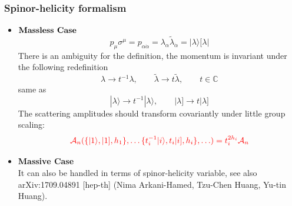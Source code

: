 \documentclass{beamer}
\newcommand{\aket}[1]{|#1\rangle}
\newcommand{\sket}[1]{|#1]}
\begin{document}
\begin{frame}
\frametitle{Spinor-helicity formalism}
    \begin{itemize}
        \item $\textbf{\text{Massless Case}}$\\
    \begin{equation*}
        p_\mu \sigma^\mu=p_{\alpha\dot{\alpha}}=\lambda_\alpha \tilde{\lambda}_{\dot{\alpha}}=\aket{\lambda}[\lambda|
    \end{equation*}
    There is an ambiguity for the definition, the momentum is invariant under the following redefinition
    \begin{equation*}
        \lambda \rightarrow t^{-1}\lambda, \qquad \tilde{\lambda}\rightarrow t\tilde{\lambda}, \qquad t\in\mathbb{C} 
    \end{equation*}
    same as 
    \begin{equation*}
        \aket{\lambda}\rightarrow t^{-1}\aket{\lambda}, \qquad \sket{\lambda}\rightarrow t\sket{\lambda}
    \end{equation*}
    The scattering amplitudes should transform covariantly under little group scaling:
    \begin{equation*}
        \color{red} \mathcal{A}_n(\{\aket{1},\sket{1},h_1\},\ldots\{t_i^{-1}\aket{i},t_i\sket{i},h_i\},\ldots )=t_i^{2h_i}\mathcal{A}_n
    \end{equation*}
    \end{itemize}
\vspace{-2em}
    \begin{itemize}
    \item \textbf{Massive Case}\\
    It can also be handled in terms of spinor-helicity variable, see also 	arXiv:1709.04891 [hep-th] (Nima Arkani-Hamed, Tzu-Chen Huang, Yu-tin Huang).
    \end{itemize}
\end{frame}
\end{document}
